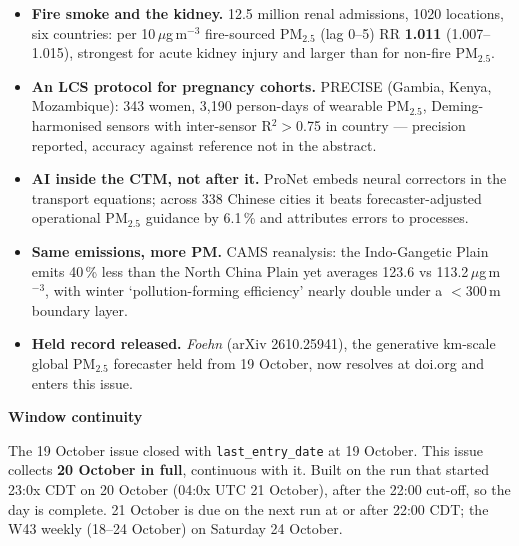 \documentclass[10pt]{article}
\begin{document}
\footnotesize
\begin{itemize}

\item \textbf{Fire smoke and the kidney.} 12.5 million renal admissions, 1020 locations, six countries: per
10\,$\mu$g\,m$^{-3}$ fire-sourced PM$_{2.5}$ (lag 0--5) RR \textbf{1.011} (1.007--1.015), strongest for acute
kidney injury and larger than for non-fire PM$_{2.5}$.

\item \textbf{An LCS protocol for pregnancy cohorts.} PRECISE (Gambia, Kenya, Mozambique): 343 women, 3,190
person-days of wearable PM$_{2.5}$, Deming-harmonised sensors with inter-sensor R$^2>$0.75 in country --- precision
reported, accuracy against reference not in the abstract.

\item \textbf{AI inside the CTM, not after it.} ProNet embeds neural correctors in the transport equations; across
338 Chinese cities it beats forecaster-adjusted operational PM$_{2.5}$ guidance by 6.1\,\% and attributes errors to
processes.

\item \textbf{Same emissions, more PM.} CAMS reanalysis: the Indo-Gangetic Plain emits 40\,\% less than the North
China Plain yet averages 123.6 vs 113.2\,$\mu$g\,m$^{-3}$, with winter `pollution-forming efficiency' nearly double
under a $<$300\,m boundary layer.

\item \textbf{Held record released.} \emph{Foehn} (arXiv 2610.25941), the generative km-scale global PM$_{2.5}$
forecaster held from 19 October, now resolves at doi.org and enters this issue.

\end{itemize}

\vspace{2mm}

\begin{keybox}
{\sffamily\bfseries\footnotesize\color{Deep}Window continuity}\\[1.2mm]
{\fontsize{7.2}{8.8}\selectfont
The 19 October issue closed with \texttt{last\_entry\_date} at 19 October. This issue collects
\textbf{20 October in full}, continuous with it. Built on the run that started 23:0x CDT on 20 October (04:0x UTC
21 October), after the 22:00 cut-off, so the day is complete. 21 October is due on the next run at or after
22:00 CDT; the W43 weekly (18--24 October) on Saturday 24 October.\par}
\end{keybox}
\end{document}
